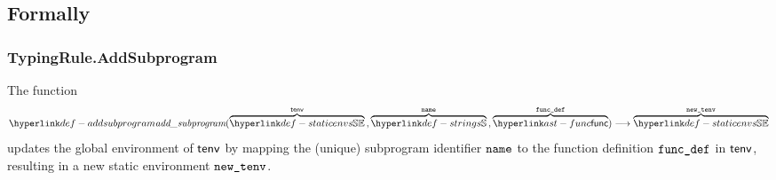 \subsection{Formally}
\begin{mathpar}
\end{mathpar}

\subsubsection{TypingRule.AddSubprogram \label{sec:TypingRule.AddSubprogram}}
\hypertarget{def-addsubprogram}{}
The function
\[
  \addsubprogram(
    \overname{\staticenvs}{\tenv} \aslsep
    \overname{\Strings}{\name} \aslsep
    \overname{\func}{\funcdef})
   \aslto
  \overname{\staticenvs}{\newtenv}
\]
updates the global environment of $\tenv$ by mapping the (unique) subprogram identifier $\name$
to the function definition $\funcdef$ in $\tenv$, resulting in a new static environment $\newtenv$.

